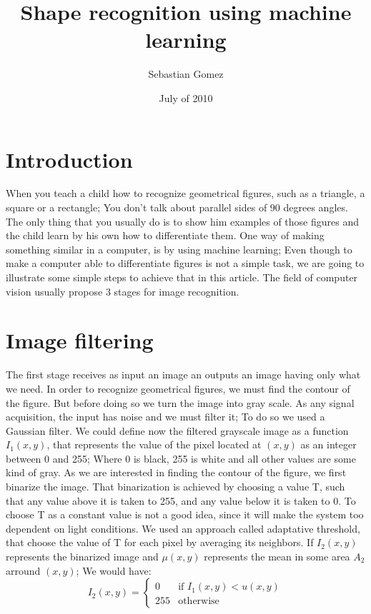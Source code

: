 \documentclass{article}
\begin{document}
\title {Shape recognition using machine learning}
\author {Sebastian Gomez}
\date {July of 2010}
\maketitle

	\section{Introduction}
	When you teach a child how to recognize geometrical figures, such as
	a triangle, a square or a rectangle; You don't talk about parallel sides of 90
	degrees angles. The only thing that you usually do is to show him examples
	of those figures and the child learn by his own how to differentiate 
	them. One way of making something similar in a computer, is by using
	machine learning; Even though to make a computer able to differentiate 
	figures is not a simple task, we are going to illustrate some simple steps
	to achieve that in this article. The field of computer vision usually
	propose 3 stages for image recognition.
	
	\section{Image filtering}
	The first stage receives as input an image an outputs an image having only
	what we need. In order to recognize geometrical figures, we must find the 
	contour of the figure. But before doing so we turn the image into gray scale.
	As any signal acquisition, the input has noise and we must filter it; To do
	so we used a Gaussian filter. We could define now the filtered grayscale image
	as a function $I_1(x,y)$, that represents the value of the pixel located at
	$(x,y)$ as an integer between 0 and 255; Where 0 is black, 255 is white and
	all other values are some kind of gray.\newline
	As we are interested in finding the contour of the figure, we first binarize
	the image. That binarization is achieved by choosing a value T, such that any
	value above it is taken to 255, and any value below it is taken to 0.
	To choose T as a constant value is not a good idea, since it will make the
	system too dependent on light conditions. We used an approach called
	adaptative threshold, that choose the value of T for each pixel by averaging
	its neighbors. If $I_2(x,y)$ represents the binarized image and $\mu(x,y)$
	represents the mean in some area $A_2$ arround $(x,y)$; We would have:
	\[ I_2(x,y) = \left\{ \begin{array}{ll}
		0   & \mbox{if $I_1(x,y) < u(x,y)$} \\
		255 & \mbox{otherwise}
	\end{array} \right. \]
	
\end{document}
